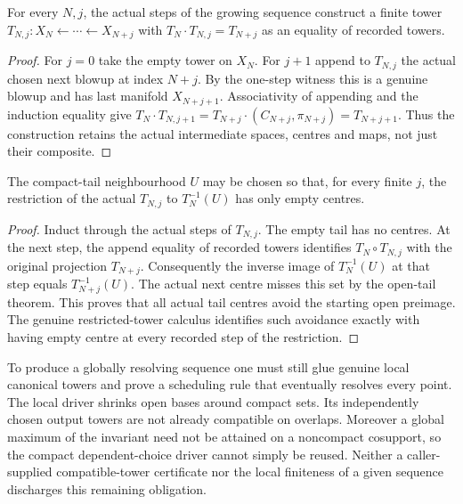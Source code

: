 \begin{definition}
\label{hir:growing-sequence-actual-tail-tower}
\leanok
For every $N,j$, the actual steps of the growing sequence construct a finite
tower $T_{N,j}:X_N\leftarrow\cdots\leftarrow X_{N+j}$ with
$T_N\mathbin{\cdot}T_{N,j}=T_{N+j}$ as an equality of recorded towers.
\end{definition}
\begin{proof}
For $j=0$ take the empty tower on $X_N$. For $j+1$ append to $T_{N,j}$ the
actual chosen next blowup at index $N+j$. By the one-step witness this is a
genuine blowup and has last manifold $X_{N+j+1}$. Associativity of appending
and the induction equality give
$T_N\mathbin{\cdot}T_{N,j+1}=T_{N+j}\mathbin{\cdot}(C_{N+j},\pi_{N+j})
=T_{N+j+1}$. Thus the construction retains the actual intermediate spaces,
centres and maps, not just their composite.
\end{proof}

\begin{theorem}
\label{hir:growing-sequence-empty-restricted-tails}
\leanok
The compact-tail neighbourhood $U$ may be chosen so that, for every finite
$j$, the restriction of the actual $T_{N,j}$ to $T_N^{-1}(U)$ has only
empty centres.
\end{theorem}
\begin{proof}
Induct through the actual steps of $T_{N,j}$. The empty tail has no centres.
At the next step, the append equality of recorded towers identifies
$T_N\circ T_{N,j}$ with the original projection $T_{N+j}$. Consequently
the inverse image of $T_N^{-1}(U)$ at that step equals $T_{N+j}^{-1}(U)$.
The actual next centre misses this set by the open-tail theorem. This proves
that all actual tail centres avoid the starting open preimage. The genuine
restricted-tower calculus identifies such avoidance exactly with having
empty centre at every recorded step of the restriction.
\end{proof}

\begin{remark}
To produce a globally resolving sequence one must still glue genuine local
canonical towers and prove a scheduling rule that eventually resolves every
point. The local driver shrinks open bases around compact sets. Its independently
chosen output towers are not already compatible on overlaps. Moreover a
global maximum of the invariant need not be attained on a noncompact
cosupport, so the compact dependent-choice driver cannot simply be reused.
Neither a caller-supplied compatible-tower certificate nor the local finiteness
of a given sequence discharges this remaining obligation.
\end{remark}
